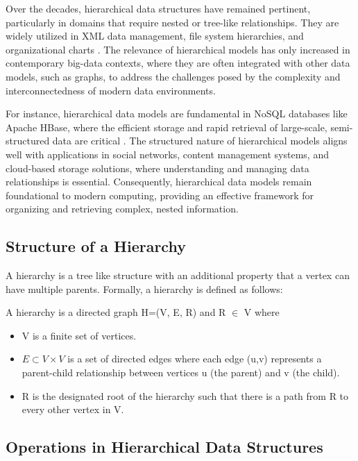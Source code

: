 Over the decades, hierarchical data structures have remained pertinent, particularly in domains that require nested or tree-like relationships. They are widely utilized in XML data management, file system hierarchies, and organizational charts \cite{DBLP:books/mk/BunemanSA99}. The relevance of hierarchical models has only increased in contemporary big-data contexts, where they are often integrated with other data models, such as graphs, to address the challenges posed by the complexity and interconnectedness of modern data environments.

For instance, hierarchical data models are fundamental in NoSQL databases like Apache HBase, where the efficient storage and rapid retrieval of large-scale, semi-structured data are critical \cite{DBLP:books/daglib/0027893}. The structured nature of hierarchical models aligns well with applications in social networks, content management systems, and cloud-based storage solutions, where understanding and managing data relationships is essential.
Consequently, hierarchical data models remain foundational to modern computing, providing an effective framework for organizing and retrieving complex, nested information.

\subsection{Structure of a Hierarchy}
A hierarchy is a tree like structure with an additional property that a vertex can have multiple parents.
Formally, a hierarchy is defined as follows:

\begin{definition}
    A hierarchy is a directed graph H=(V, E, R) and R $\in$ V where
    \begin{itemize}
        \item V is a finite set of vertices.
        \item $E \subset V \times V$ is a set of directed edges where each edge (u,v) represents a parent-child relationship between vertices u (the parent) and v (the child).
        \item R is the designated root of the hierarchy such that there is a path from R to every other vertex in V.
        
    \end{itemize} 
\end{definition}



\subsection{Operations in Hierarchical Data Structures}

